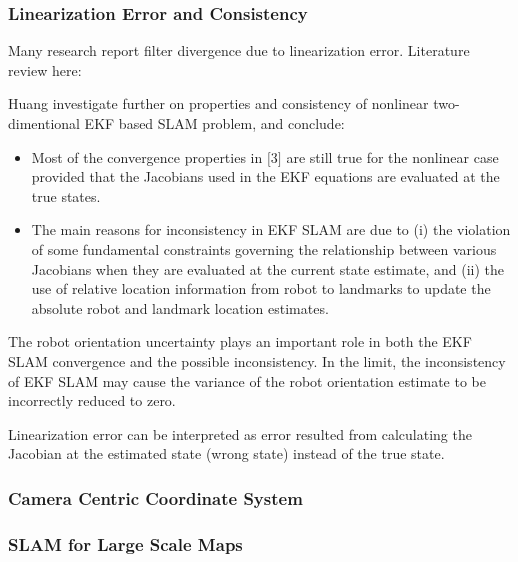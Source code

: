 \subsubsection{Linearization Error and Consistency}
\label{sec:Linearization_error_and_consistency}

Many research report filter divergence due to linearization error. 
Literature review here:

Huang investigate further on properties and consistency of nonlinear 
two-dimentional EKF based SLAM problem, and conclude:

\begin{itemize}
  \item Most of the convergence properties in $[$3$]$ are still true for 
  the nonlinear case provided that the Jacobians used in the EKF equations 
  are evaluated at the true states.
  \item The main reasons for inconsistency in EKF SLAM are due to (i) the 
  violation of some fundamental constraints governing the relationship 
  between various Jacobians when they are evaluated at the current state 
  estimate, and (ii) the use of relative location information from robot 
  to landmarks to update the absolute robot and landmark location 
  estimates.
\end{itemize}

The robot orientation uncertainty plays an important role in both the 
EKF SLAM convergence and the possible inconsistency. In the limit, the 
inconsistency of EKF SLAM may cause the variance of the robot 
orientation estimate to be incorrectly reduced to zero.

Linearization error can be interpreted as error resulted from 
calculating the Jacobian at the estimated state (wrong state) instead of 
the true state. 

\subsubsection{Camera Centric Coordinate System}
\label{sec:cam_centric}

\subsubsection{SLAM for Large Scale Maps}